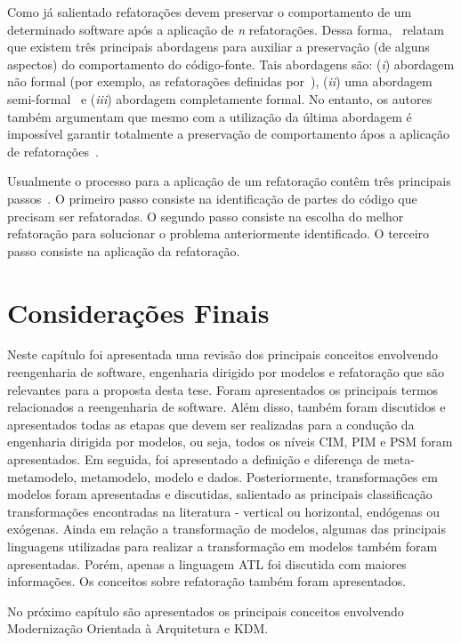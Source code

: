 Como já salientado refatorações devem preservar o comportamento de um determinado software após a aplicação de \textit{n} refatorações. Dessa forma,~ relatam que existem três principais abordagens para auxiliar a preservação (de alguns aspectos) do comportamento do código-fonte. Tais abordagens são: (\textit{i}) abordagem não formal (por exemplo, as refatorações definidas por~), (\textit{ii}) uma abordagem semi-formal~\cite{Roberts_1999} e (\textit{iii}) abordagem completamente formal. No entanto, os autores também argumentam que mesmo com a utilização da última abordagem é impossível garantir totalmente a preservação de comportamento ápos a aplicação de refatorações~\cite{Mens_and_Tourwe_2004,Cinneide_2000}.%


Usualmente o processo para a aplicação de um refatoração contêm três principais passos~\cite{Wake_2003}. O primeiro passo consiste na identificação de partes do código que precisam ser refatoradas. O segundo passo consiste na escolha do melhor refatoração para solucionar o problema anteriormente identificado. O terceiro passo consiste na aplicação da refatoração.

\section{Considerações Finais}

Neste capítulo foi apresentada uma revisão dos principais conceitos envolvendo reengenharia de software, engenharia dirigido por modelos e refatoração que são relevantes para a proposta desta tese. Foram apresentados os principais termos relacionados a reengenharia de software. Além disso, também foram discutidos e apresentados todas as etapas que devem ser realizadas para a condução da engenharia dirigida por modelos, ou seja, todos os níveis CIM, PIM e PSM foram apresentados. Em seguida, foi apresentado a definição e diferença de meta-metamodelo, metamodelo, modelo e dados. Posteriormente, transformações em modelos foram apresentadas e discutidas, salientado as principais classificação transformações encontradas na literatura - vertical ou horizontal, endógenas ou exógenas. Ainda em relação a transformação de modelos, algumas das principais linguagens utilizadas para realizar a transformação em modelos também foram apresentadas. Porém, apenas a linguagem ATL foi discutida com maiores informações. Os conceitos sobre refatoração também foram apresentados.

No próximo capítulo são apresentados os principais conceitos envolvendo Modernização Orientada à Arquitetura e KDM.